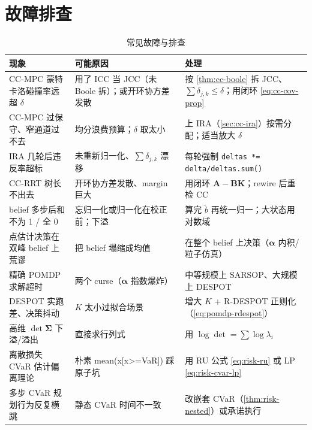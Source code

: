 \section*{故障排查}
\label{sec:plan-chance-trouble}

\begin{table}[H]\centering\small
\caption{常见故障与排查}
\label{tab:plan-chance-trouble}
\begin{tabular}{p{}p{}p{}}
\toprule
现象 & 可能原因 & 处理 \\
\midrule
CC-MPC 蒙特卡洛碰撞率远超 $\delta$ & 用了 ICC 当 JCC（未 Boole 拆）；或开环协方差发散 & 按 \cref{thm:cc-boole} 拆 JCC、$\sum\delta_{j,k}\le\delta$；用闭环 \cref{eq:cc-cov-prop} \\
CC-MPC 过保守、窄通道过不去 & 均分浪费预算；$\delta$ 取太小 & 上 IRA（\cref{sec:cc-ira}）按需分配；适当放大 $\delta$ \\
IRA 几轮后违反率超标 & 未重新归一化、$\sum\delta_{j,k}$ 漂移 & 每轮强制 \texttt{deltas *= delta/\allowbreak deltas.\allowbreak sum()} \\
CC-RRT 树长不出去 & 开环协方差发散、margin 巨大 & 用闭环 $\mathbf{A}-\mathbf{B}\mathbf{K}$；rewire 后重检 CC \\
belief 多步后和不为 1 / 全 0 & 忘归一化或归一化在校正前；下溢 & 算完 $\tilde b$ 再统一归一；大状态用对数域 \\
点估计决策在双峰 belief 上荒谬 & 把 belief 塌缩成均值 & 在整个 belief 上决策（$\boldsymbol{\alpha}$ 内积/粒子仿真）\\
精确 POMDP 求解超时 & 两个 curse（$\boldsymbol{\alpha}$ 指数爆炸）& 中等规模上 SARSOP、大规模上 DESPOT \\
DESPOT 实跑差、决策抖动 & $K$ 太小过拟合场景 & 增大 $K$ + R-DESPOT 正则化（\cref{eq:pomdp-rdespot}）\\
高维 $\det\boldsymbol{\Sigma}$ 下溢/溢出 & 直接求行列式 & 用 $\log\det=\sum\log\lambda_i$ \\
离散损失 CVaR 估计偏离理论 & 朴素 mean(x[x>=VaR]) 踩原子坑 & 用 RU 公式 \cref{eq:risk-ru} 或 LP \cref{eq:risk-cvar-lp} \\
多步 CVaR 规划行为反复横跳 & 静态 CVaR 时间不一致 & 改嵌套 CVaR（\cref{thm:risk-nested}）或承诺执行 \\
\bottomrule
\end{tabular}
\end{table}
